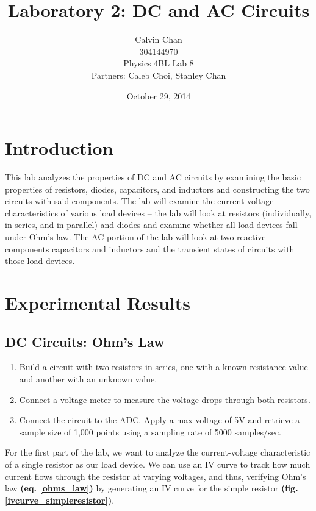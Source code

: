 \documentclass{article}
\begin{document}
\title{Laboratory 2: DC and AC Circuits}
\date{October 29, 2014}
\author{Calvin Chan\\304144970\\Physics 4BL Lab 8\\Partners: Caleb Choi, Stanley
Chan}

\maketitle

\section{Introduction}
This lab analyzes the properties of DC and AC circuits by examining the basic
properties of resistors, diodes, capacitors, and inductors and constructing the
two circuits with said components. The lab will examine the current-voltage
characteristics of various load devices – the lab will look at resistors
(individually, in series, and in parallel) and diodes and examine whether all
load devices fall under Ohm's law. The AC portion of the lab will look at two
reactive components capacitors and inductors and the transient states of
circuits with those load devices.

\section{Experimental Results}

\subsection{DC Circuits: Ohm's Law}

\begin{enumerate}
    \item Build a circuit with two resistors in series, one with a known
    resistance value and another with an unknown value.
    \item Connect a voltage meter to measure the voltage drops through both
    resistors.
    \item Connect the circuit to the ADC. Apply a max voltage of 5V and retrieve
    a sample size of 1,000 points using a sampling rate of 5000 samples/sec.
\end{enumerate}

For the first part of the lab, we want to analyze the current-voltage
characteristic of a single resistor as our load device. We can use an IV curve
to track how much current flows through the resistor at varying voltages, and
thus, verifying Ohm's law \textbf{(eq. \ref{ohms_law})} by generating an IV
curve for the simple resistor \textbf{(fig. \ref{ivcurve_simpleresistor})}. 
\end{document}
